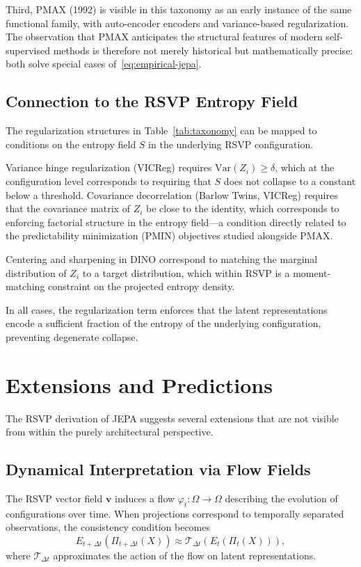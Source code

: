\documentclass[12pt, oneside]{article}
\begin{document}
Third, PMAX (1992) is visible in this taxonomy as an early instance of the same functional family, with auto-encoder encoders and variance-based regularization. The observation that PMAX anticipates the structural features of modern self-supervised methods is therefore not merely historical but mathematically precise: both solve special cases of~\eqref{eq:empirical-jepa}.

\subsection{Connection to the RSVP Entropy Field}

The regularization structures in Table~\ref{tab:taxonomy} can be mapped to conditions on the entropy field $S$ in the underlying RSVP configuration.

Variance hinge regularization (VICReg) requires $\text{Var}(Z_i) \geq \delta$, which at the configuration level corresponds to requiring that $S$ does not collapse to a constant below a threshold. Covariance decorrelation (Barlow Twins, VICReg) requires that the covariance matrix of $Z_i$ be close to the identity, which corresponds to enforcing factorial structure in the entropy field---a condition directly related to the predictability minimization (PMIN) objectives studied alongside PMAX.

Centering and sharpening in DINO correspond to matching the marginal distribution of $Z_i$ to a target distribution, which within RSVP is a moment-matching constraint on the projected entropy density.

In all cases, the regularization term enforces that the latent representations encode a sufficient fraction of the entropy of the underlying configuration, preventing degenerate collapse.

\section{Extensions and Predictions}
\label{sec:extensions}

The RSVP derivation of JEPA suggests several extensions that are not visible from within the purely architectural perspective.

\subsection{Dynamical Interpretation via Flow Fields}

The RSVP vector field $\mathbf{v}$ induces a flow $\varphi_t : \Omega \to \Omega$ describing the evolution of configurations over time. When projections correspond to temporally separated observations, the consistency condition becomes
\[
E_{t+\Delta t}(\Pi_{t+\Delta t}(X)) \approx \mathcal{T}_{\Delta t}(E_t(\Pi_t(X))),
\]
where $\mathcal{T}_{\Delta t}$ approximates the action of the flow on latent representations.
\end{document}
